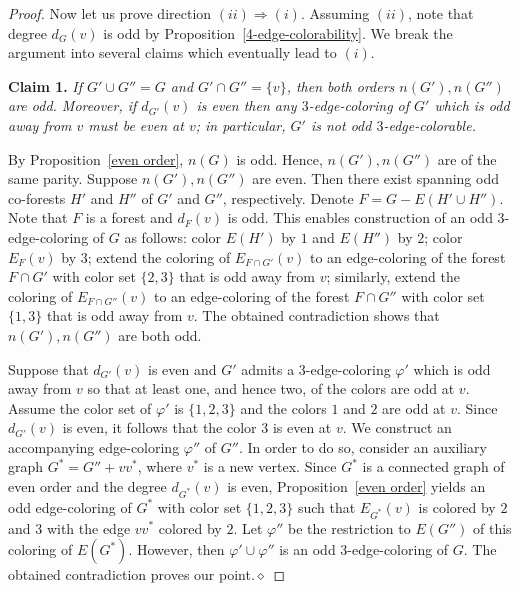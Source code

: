 \documentclass[a4paper,12pt]{article}
\numberwithin{equation}{section}
\begin{document}
\begin{proof}
\medskip

Now let us prove direction $(ii)\Rightarrow(i)$. Assuming $(ii)$, note that degree $d_G(v)$ is odd by Proposition~\ref{4-edge-colorability}. We break the argument into several claims  which eventually lead to $(i)$.

\bigskip

\noindent \textbf{Claim 1.} \textit{If $G'\cup G''=G$ and $G'\cap G''=\{v\}$, then both orders $n(G'),n(G'')$ are odd. Moreover, if $d_{G'}(v)$ is even then any $3$-edge-coloring of $G'$ which is odd away from $v$ must be even at $v$; in particular, $G'$ is not odd $3$-edge-colorable.}

\medskip

\noindent By Proposition~\ref{even order}, $n(G)$ is odd. Hence, $n(G'),n(G'')$ are of the same parity. Suppose $n(G'),n(G'')$ are even. Then there exist spanning odd co-forests $H'$ and $H''$ of $G'$ and $G''$, respectively. Denote $F=G-E(H'\cup H'')$. Note that $F$ is a forest and $d_F(v)$ is odd. This enables construction of an odd $3$-edge-coloring of $G$ as follows: color $E(H')$ by $1$ and $E(H'')$ by $2$; color $E_F(v)$ by $3$; extend the coloring of $E_{F\cap G'}(v)$ to an edge-coloring of the forest $F\cap G'$ with color set $\{2,3\}$ that is odd away from $v$; similarly, extend the coloring of $E_{F\cap G''}(v)$ to an edge-coloring of the forest $F\cap G''$ with color set $\{1,3\}$ that is odd away from $v$. The obtained contradiction shows that $n(G'),n(G'')$ are both odd.

Suppose that $d_{G'}(v)$ is even and $G'$ admits a $3$-edge-coloring $\varphi'$ which is odd away from $v$ so that at least one, and hence two, of the colors are odd at $v$.
Assume the color set of $\varphi'$ is $\{1,2,3\}$ and the colors $1$ and $2$ are odd at $v$. Since $d_{G'}(v)$ is even, it follows that the color $3$ is even at $v$. We construct an accompanying edge-coloring $\varphi''$ of $G''$. In order to do so, consider an auxiliary graph $G^*=G''+vv^*$, where $v^*$ is a new vertex. Since $G^*$ is a connected graph of even order and the degree $d_{G^*}(v)$ is even, Proposition~\ref{even order} yields an odd edge-coloring of $G^*$ with color set $\{1,2,3\}$ such that $E_{G^*}(v)$ is colored by $2$ and $3$ with the edge $vv^*$ colored by $2$. Let $\varphi''$ be the restriction to $E(G'')$ of this coloring of $E(G^*)$. However, then $\varphi'\cup\varphi''$ is an odd $3$-edge-coloring of $G$. The obtained contradiction proves our point.\hfill$\diamond$

\bigskip


\end{proof}
\end{document}
